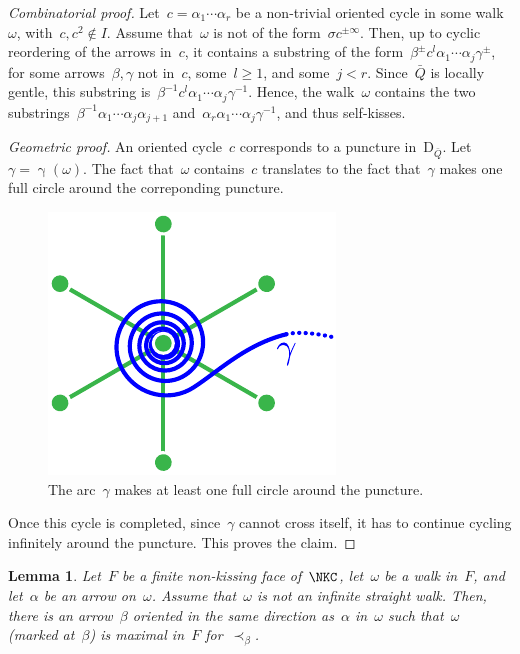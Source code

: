 \documentclass{amsart}
\newtheorem{lemma}[theorem]{Lemma}
\theoremstyle{definition}
\newcommand{\para}[1]{\medskip\noindent\textit{#1.}} %
\newcommand{\dissection}{\mathrm{D}} %
\newcommand{\curveof}{\operatorname{\gamma}} %
\begin{document}
\begin{proof}[Combinatorial proof]
Let~$c=\alpha_1\cdots\alpha_r$ be a non-trivial oriented cycle in some walk~$\omega$, with~$c, c^2\notin I$.
Assume that~$\omega$ is not of the form~$\sigma c^{\pm\infty}$.
Then, up to cyclic reordering of the arrows in~$c$, it contains a substring of the form~$\beta^\pm c^l \alpha_1\cdots\alpha_j\gamma^\pm$, for some arrows~$\beta,\gamma$ not in~$c$, some~$l\geq 1$, and some~$j<r$.
Since~$\bar Q$ is locally gentle, this substring is~$\beta^{-1} c^l \alpha_1\cdots\alpha_j\gamma^{-1}$.
Hence, the walk~$\omega$ contains the two substrings~$\beta^{-1}\alpha_1\cdots\alpha_j\alpha_{j+1}$ and~$\alpha_r\alpha_1\cdots\alpha_j\gamma^{-1}$, and thus self-kisses.

\para{Geometric proof}
An oriented cycle~$c$ corresponds to a puncture in~$\dissection_{\bar Q}$.
Let~$\gamma = \curveof(\omega)$.  The fact that~$\omega$ contains~$c$ translates to the fact that~$\gamma$ makes one full circle around the correponding puncture.

\begin{figure}[h]
	\capstart
	\centerline{\includegraphics[scale=.7]{infiniteCurve2.pdf}}
	\caption{The arc~$\gamma$ makes at least one full circle around the puncture.}
	\label{fig:aroundPuncture1}
\end{figure}

Once this cycle is completed, since~$\gamma$ cannot cross itself, it has to continue cycling infinitely around the puncture.  This proves the claim.
\end{proof}

\begin{lemma}\label{lem:ExistenceOfDistinguishedArrows}
Let~$F$ be a finite non-kissing face of~$\NKC$, let~$\omega$ be a walk in~$F$, and let~$\alpha$ be an arrow on~$\omega$.
Assume that~$\omega$ is not an infinite straight walk.
Then, there is an arrow~$\beta$ oriented in the same direction as~$\alpha$ in~$\omega$ such that~$\omega$ (marked at~$\beta$) is maximal in~$F$ for~$\prec_\beta$.
\end{lemma}
\end{document}
